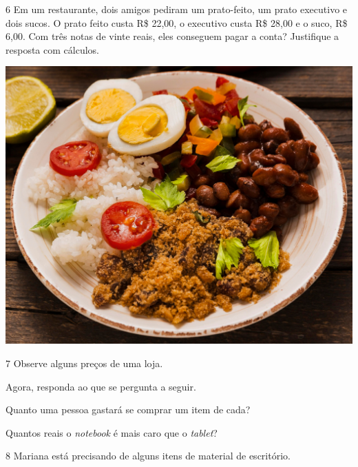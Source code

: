 \num{6} Em um restaurante, dois amigos pediram um prato-feito, um prato executivo
e dois sucos. O prato feito custa R\$ 22,00, o executivo custa R\$
28,00 e o suco, R\$ 6,00. Com três notas de vinte reais, eles
conseguem pagar a conta? Justifique a resposta com cálculos.

\begin{center}
\includegraphics[width=.5\textwidth]{media/image37c.jpg}
\end{center}


\num{7} Observe alguns preços de uma loja.


Agora, responda ao que se pergunta a seguir.

\begin{escolha}
\item
  Quanto uma pessoa gastará se comprar um item de cada?\\

\item
  Quantos reais o \textit{notebook} é mais caro que o \textit{tablet}?\\
\end{escolha}

\pagebreak

\num{8} Mariana está precisando de alguns itens de material de escritório.

